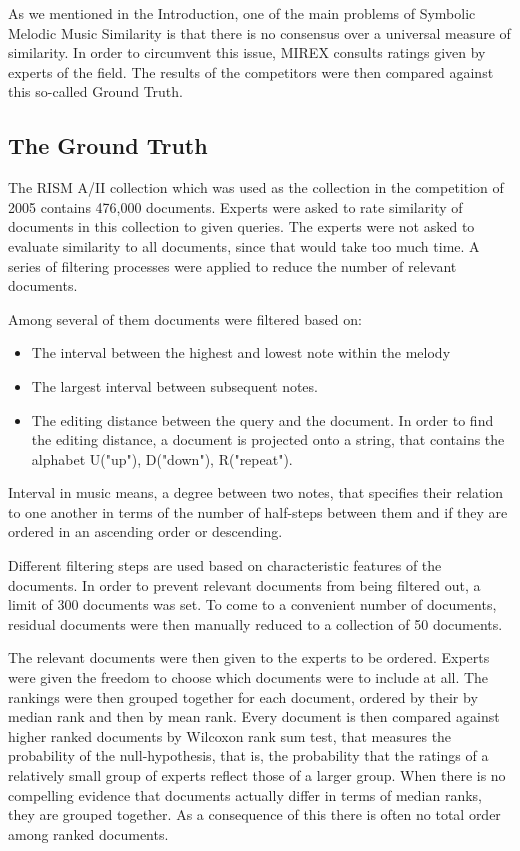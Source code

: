 \documentclass{llncs}
\begin{document}
\begin{itemize}
		As we mentioned in the Introduction, one of the main problems of Symbolic Melodic Music Similarity is that there is no consensus over a universal measure of similarity. In order to circumvent this issue, MIREX consults ratings given by experts of the field. The results of the competitors were then compared against this so-called Ground Truth.
		
		\subsection{The Ground Truth}
 		The RISM A/II collection which was used as the collection in the competition of 2005 contains 476,000 documents. Experts were asked to rate similarity of documents in this collection to given queries. The experts were not asked to evaluate similarity to all documents, since that would take too much time. A series of filtering processes were applied to reduce the number of relevant documents. 

 		Among several of them documents were filtered based on: 

 		\begin{itemize}
 			\item The interval between the highest and lowest note within the melody
 			\item The largest interval between subsequent notes.
 			\item The editing distance between the query and the document. In order to find the editing distance, a document is projected onto a string, that contains the alphabet U("up"), D("down"), R("repeat"). 
 		\end{itemize} 

        Interval in music means, a degree between two notes, that specifies their relation to one another in terms of the number of half-steps between them and if they are ordered in an ascending order or descending.
	    
 		Different filtering steps are used based on characteristic features of the documents. In order to prevent relevant documents from being filtered out, a limit of 300 documents was set. To come to a convenient number of documents, residual documents were then manually reduced to a collection of 50 documents.

 		The relevant documents were then given to the experts to be ordered. Experts were given the freedom to choose which documents were to include at all. The rankings were then grouped together for each document, ordered by their by median rank and then by mean rank. Every document is then compared against higher ranked documents by Wilcoxon rank sum test, that measures the probability of the null-hypothesis, that is, the probability that the ratings of a relatively small group of experts reflect those of a larger group. When there is no compelling evidence that documents actually differ in terms of median ranks, they are grouped together. As a consequence of this there is often no total order among ranked documents. 


\end{itemize}
\end{document}
